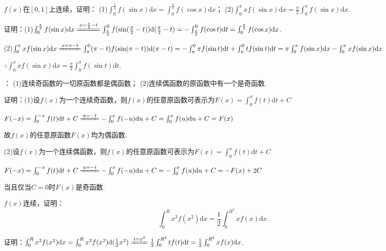 \documentclass[12pt,UTF8]{ctexart}
\begin{document}
\begin{enumerate}
$f(x)$在$[0,1]$上连续，证明：
\newline
(1)$\int_0^{\frac\pi2}f(\sin x)\mathrm dx=\int_0^{\frac\pi2}f(\cos x)\mathrm dx$；
\newline
(2)$\int_0^\pi xf(\sin x)\mathrm dx=\frac\pi2\int_0^\pi f(\sin x)\mathrm dx$.

证明：(1)$\int_0^{\frac\pi2}f(\sin x)\mathrm dx\xlongequal{x=\frac\pi2-t}\int_{\frac\pi2}^0f(\sin(\frac\pi2-t))\mathrm d(\frac\pi2-t)=-\int_{\frac\pi2}^0f(\cos t)\mathrm dt=\int_0^{\frac\pi2}f(\cos x)\mathrm dx$.

(2)$\int_0^\pi xf(\sin x)\mathrm dx\xlongequal{x=\pi-t}\int_\pi^0(\pi-t)f(\sin(\pi-t))\mathrm d(\pi-t)=-\int_\pi^0\pi f(\sin t)\mathrm dt+\int_\pi^0tf(\sin t)\mathrm dt\\
=\pi\int_0^\pi f(\sin x)\mathrm dx-\int_0^\pi xf(\sin x)\mathrm dx$

$\therefore\int_0^\pi xf(\sin x)\mathrm dx=\frac\pi2\int_0^\pi f(\sin t)\mathrm dt$.

：
\newline
(1)连续奇函数的一切原函数都是偶函数；
\newline
(2)连续偶函数的原函数中有一个是奇函数.

证明：(1)设$f(x)$为一个连续奇函数，则$f(x)$的任意原函数可表示为$F(x)=\int_0^x f(t)\mathrm dt+C$

$F(-x)=\int_0^{-x}f(t)\mathrm dt+C\xlongequal{u=-t}-\int_0^{x}f(-u)\mathrm du+C=\int_0^xf(u)\mathrm du+C=F(x)$

故$f(x)$的任意原函数$F(x)$均为偶函数.

(2)设$f(x)$为一个连续偶函数，则$f(x)$的任意原函数可表示为$F(x)=\int_0^x f(t)\mathrm dt+C$

$F(-x)=\int_0^{-x}f(t)\mathrm dt+C\xlongequal{u=-t}-\int_0^{x}f(-u)\mathrm du+C=-\int_0^xf(u)\mathrm du+C=-F(x)+2C$

当且仅当$C=0$时$F(x)$是奇函数.

$f(x)$连续，证明：
\[
\int_0^Rx^3f(x^2)\mathrm dx=\frac12\int_0^{R^2}xf(x)\mathrm dx.
\]

证明：$\int_0^Rx^3f(x^2)\mathrm dx=\int_0^Rx^2f(x^2)\mathrm d(\frac12x^2)\xlongequal{t=x^2}\frac12\int_0^{R^2}tf(t)\mathrm dt=\frac12\int_0^{R^2}xf(x)\mathrm dx$.
\end{enumerate}
\end{document}
